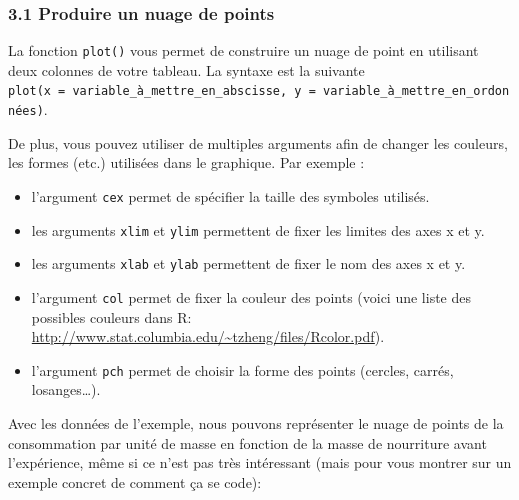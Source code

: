 \documentclass[
]{article}
\newenvironment{Shaded}{\begin{snugshade}}{\end{snugshade}}
\newcommand{\CharTok}[1]{\textcolor[rgb]{0.31,0.60,0.02}{#1}}
\newcommand{\DataTypeTok}[1]{\textcolor[rgb]{0.13,0.29,0.53}{#1}}
\newcommand{\DecValTok}[1]{\textcolor[rgb]{0.00,0.00,0.81}{#1}}
\newcommand{\KeywordTok}[1]{\textcolor[rgb]{0.13,0.29,0.53}{\textbf{#1}}}
\newcommand{\NormalTok}[1]{#1}
\newcommand{\OperatorTok}[1]{\textcolor[rgb]{0.81,0.36,0.00}{\textbf{#1}}}
\newcommand{\StringTok}[1]{\textcolor[rgb]{0.31,0.60,0.02}{#1}}
\providecommand{\tightlist}{%
  \setlength{\itemsep}{0pt}\setlength{\parskip}{0pt}}
\begin{document}
\hypertarget{produire-un-nuage-de-points}{%
\subsubsection{3.1 Produire un nuage de
points}\label{produire-un-nuage-de-points}}

La fonction \texttt{plot()} vous permet de construire un nuage de point
en utilisant deux colonnes de votre tableau. La syntaxe est la suivante
\texttt{plot(x\ =\ variable\_à\_mettre\_en\_abscisse,\ y\ =\ variable\_à\_mettre\_en\_ordonnées)}.

De plus, vous pouvez utiliser de multiples arguments afin de changer les
couleurs, les formes (etc.) utilisées dans le graphique. Par exemple :

\begin{itemize}
\tightlist
\item
  l'argument \texttt{cex} permet de spécifier la taille des symboles
  utilisés.
\item
  les arguments \texttt{xlim} et \texttt{ylim} permettent de fixer les
  limites des axes x et y.
\item
  les arguments \texttt{xlab} et \texttt{ylab} permettent de fixer le
  nom des axes x et y.
\item
  l'argument \texttt{col} permet de fixer la couleur des points (voici
  une liste des possibles couleurs dans R:
  \url{http://www.stat.columbia.edu/~tzheng/files/Rcolor.pdf}).
\item
  l'argument \texttt{pch} permet de choisir la forme des points
  (cercles, carrés, losanges\ldots). 
\end{itemize}

Avec les données de l'exemple, nous pouvons représenter le nuage de
points de la consommation par unité de masse en fonction de la masse de
nourriture avant l'expérience, même si ce n'est pas très intéressant
(mais pour vous montrer sur un exemple concret de comment ça se code):

\begin{Shaded}
\end{Shaded}
\end{document}
